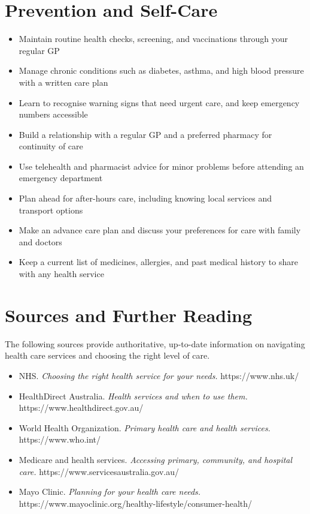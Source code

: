 \section*{Prevention and Self-Care}
\begin{itemize}
    \item Maintain routine health checks, screening, and vaccinations through your regular GP
    \item Manage chronic conditions such as diabetes, asthma, and high blood pressure with a written care plan
    \item Learn to recognise warning signs that need urgent care, and keep emergency numbers accessible
    \item Build a relationship with a regular GP and a preferred pharmacy for continuity of care
    \item Use telehealth and pharmacist advice for minor problems before attending an emergency department
    \item Plan ahead for after-hours care, including knowing local services and transport options
    \item Make an advance care plan and discuss your preferences for care with family and doctors
    \item Keep a current list of medicines, allergies, and past medical history to share with any health service
\end{itemize}

\section*{Sources and Further Reading}
The following sources provide authoritative, up-to-date information on navigating health care services and choosing the right level of care.
\begin{itemize}
    \item NHS. \textit{Choosing the right health service for your needs.} https://www.nhs.uk/
    \item HealthDirect Australia. \textit{Health services and when to use them.} https://www.healthdirect.gov.au/
    \item World Health Organization. \textit{Primary health care and health services.} https://www.who.int/
    \item Medicare and health services. \textit{Accessing primary, community, and hospital care.} https://www.servicesaustralia.gov.au/
    \item Mayo Clinic. \textit{Planning for your health care needs.} https://www.mayoclinic.org/healthy-lifestyle/consumer-health/
\end{itemize}
